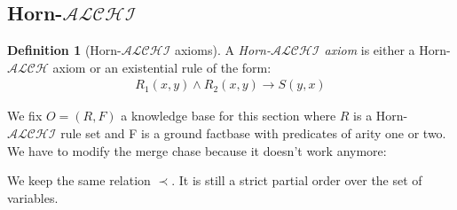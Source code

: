 \documentclass{article}
\theoremstyle{definition}
\newtheorem{definition}{Definition}[section]
\theoremstyle{remark}
\begin{document}
\subsection{Horn-$\mathcal{ALCHI}$}

\begin{definition}[Horn-$\mathcal{ALCHI}$ axioms]
A \emph{Horn-$\mathcal{ALCHI}$ axiom} is either a Horn-$\mathcal{ALCH}$ axiom or an existential rule of the form:
\begin{align}
R_1(x,y) \wedge R_2(x,y) \rightarrow S(y,x)
\end{align}

\end{definition}



We fix $O=(R,F)$ a knowledge base for this section where $R$ is a Horn-$\mathcal{ALCHI}$ rule set and F is a ground factbase with predicates of arity one or two. We have to modify the merge chase because it doesn't work anymore:

We keep the same relation $\prec$. It is still a strict partial order over the set of variables.





\end{document}
